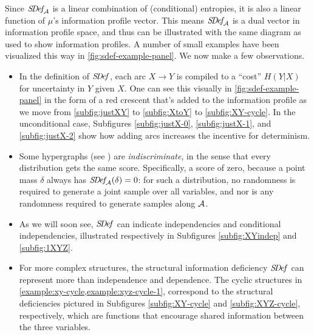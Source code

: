

Since $\mathit{S\mskip-3.5muD\mskip-2.5mue\mskip-1.5muf}_{\!\mathcal A}$ is a linear combination of (conditional) entropies, it is also a linear function of $\mu$'s information profile vector.
This means $\mathit{S\mskip-3.5muD\mskip-2.5mue\mskip-1.5muf}_{\!\mathcal A}$ is a dual vector in information profile space, and thus can be illustrated with the same diagram as used to show information profiles.
A number of small examples have been visualized this way in \cref{fig:sdef-example-panel}.
We now make a few observations.

\begin{itemize}
\item
In the definition of $\mathit{S\mskip-3.5muD\mskip-2.5mue\mskip-1.5muf}$, each arc $X\to Y$ is compiled to a ``cost'' $H(Y|X)$ for uncertainty in $Y$ given $X$.
One can see this visually in \cref{fig:sdef-example-panel}
in the form of a red crescent that's added to the information profile as we move 
from \ref{subfig:justXY} to \ref{subfig:XtoY} to \ref{subfig:XY-cycle}.
In the unconditional case,
	Subfigures \ref{subfig:justX-0}, \ref{subfig:justX-1}, 
    and \ref{subfig:justX-2} show
    how adding arcs increases the incentive for determinism.

\item 
Some hypergraphs (see ) are \emph{indiscriminate}, in the sense that every distribution gets the same score.
Specifically, a score of zero, because a point mass $\delta$ always has $\mathit{S\mskip-3.5muD\mskip-2.5mue\mskip-1.5muf}_{\!\mathcal A}(\delta) = 0$:
for such a distribution, no randomness is required to generate a joint sample over all variables, and nor is any randomness required to generate samples along $\mathcal A$.

\item
As we will soon see, 
 $\mathit{S\mskip-3.5muD\mskip-2.5mue\mskip-1.5muf}$ can indicate independencies and conditional independencies, illustrated respectively in Subfigures \ref{subfig:XYindep} and \ref{subfig:1XYZ}.

\item
 For more complex structures, the
    structural information deficiency $\mathit{S\mskip-3.5muD\mskip-2.5mue\mskip-1.5muf}$ 
    can represent more than independence and dependence. 
The cyclic structures in \cref{example:xy-cycle,example:xyz-cycle-1}, 
    correspond to the structural deficiencies pictured
    in Subfigures \ref{subfig:XY-cycle} and \ref{subfig:XYZ-cycle}, respectively,
    which are functions that encourage shared information between the three variables. 
    

\end{itemize}
